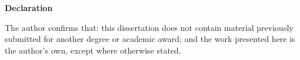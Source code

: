 \vspace*{\fill}
\noindent \textbf{Declaration}

\noindent The author confirms that: this dissertation does not contain material previously submitted for another degree or academic award; and the work presented here is the author's own, except where otherwise stated.
